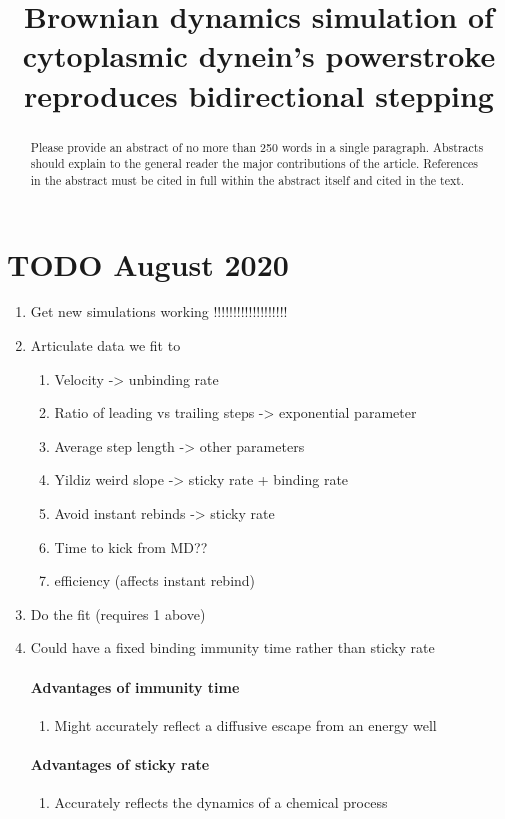 \documentclass[9pt,twocolumn,twoside]{article}
\title{Brownian dynamics simulation of cytoplasmic dynein's powerstroke reproduces bidirectional stepping}
\begin{document}
\maketitle

\begin{abstract}
  Please provide an abstract of no more than 250 words in a single paragraph. Abstracts should explain to the general reader the major contributions of the article. References in the abstract must be cited in full within the abstract itself and cited in the text.
\end{abstract}

\section*{TODO August 2020}
\begin{enumerate}
  \item Get new simulations working !!!!!!!!!!!!!!!!!!!
  \item Articulate data we fit to
  \begin{enumerate}
    \item Velocity -> unbinding rate
    \item Ratio of leading vs trailing steps -> exponential parameter
    \item Average step length -> other parameters
    \item Yildiz weird slope -> sticky rate + binding rate
    \item Avoid instant rebinds -> sticky rate
    \item Time to kick from MD??
    \item efficiency (affects instant rebind)
  \end{enumerate}
  \item Do the fit (requires 1 above)
  \item Could have a fixed binding immunity time rather than sticky rate
  \paragraph{Advantages of immunity time}
  \begin{enumerate}
    \item Might accurately reflect a diffusive escape from an energy well
  \end{enumerate}
  \paragraph{Advantages of sticky rate}
  \begin{enumerate}
    \item Accurately reflects the dynamics of a chemical process
  \end{enumerate}
\end{enumerate}
\end{document}
